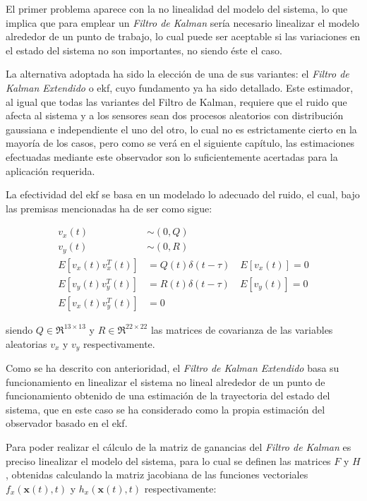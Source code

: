 El primer problema aparece con la no linealidad del modelo del sistema, lo que implica que para emplear un \emph{Filtro de Kalman} sería necesario linealizar el modelo alrededor de un punto de trabajo, lo cual puede ser aceptable si las variaciones en el estado del sistema no son importantes, no siendo éste el caso. \par

La alternativa adoptada ha sido la elección de una de sus variantes: el \emph{Filtro de Kalman Extendido} o \acrshort{ekf}, cuyo fundamento ya ha sido detallado. Este estimador, al igual que todas las variantes del Filtro de Kalman, requiere que el ruido que afecta al sistema y a los sensores sean dos procesos aleatorios con distribución gaussiana e independiente el uno del otro, lo cual no es estrictamente cierto en la mayoría de los casos, pero como se verá en el siguiente capítulo, las estimaciones efectuadas mediante este observador son lo suficientemente acertadas para la aplicación requerida. \par 

La efectividad del \acrshort{ekf} se basa en un modelado lo adecuado del ruido, el cual, bajo las premisas mencionadas ha de ser como sigue:

\begin{equation}
\begin{split}
	v_x(t) &\sim (0,Q) \\
	v_y(t) &\sim (0,R) \\
	E[v_x(t)v_x^T(t)] &= Q(t)\delta(t-\tau) \quad E[v_x(t)] = 0 \\
	E[v_y(t)v_y^T(t)] &= R(t)\delta(t-\tau) \quad E[v_y(t)] = 0 \\
	E[v_x(t)v_y^T(t)] &= 0
\end{split}
\end{equation}

\noindent
siendo $Q\in\Re^{13\times13}$ y $R\in\Re^{22\times22}$ las matrices de covarianza de las variables aleatorias $v_x$ y $v_y$ respectivamente. \par 

Como se ha descrito con anterioridad, el \emph{Filtro de Kalman Extendido} basa su funcionamiento en linealizar el sistema no lineal alrededor de un punto de funcionamiento obtenido de una estimación de la trayectoria del estado del sistema, que en este caso se ha considerado como la propia estimación del observador basado en el \acrshort{ekf}. \par

Para poder realizar el cálculo de la matriz de ganancias del \emph{Filtro de Kalman} es preciso linealizar el modelo del sistema, para lo cual se definen las matrices $F$ y $H$, obtenidas calculando la matriz jacobiana de las funciones vectoriales $f_x(\boldsymbol{x}(t),t)$ y $h_x(\boldsymbol{x}(t),t)$ respectivamente:

